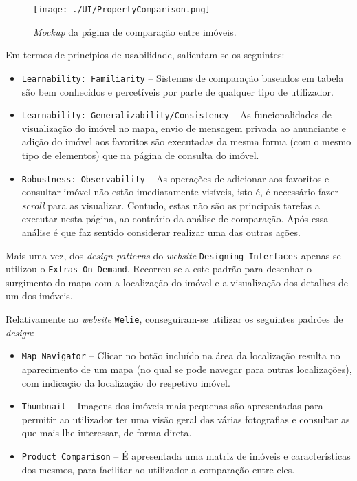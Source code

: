 \begin{figure}[H]
    \centering
    \texttt{[image: ./UI/PropertyComparison.png]}
    \caption{\textit{Mockup} da página de comparação entre imóveis.}
    \label{fig:property_comparison}
\end{figure}

Em termos de princípios de usabilidade, salientam-se os seguintes:

\begin{itemize}
    \item \texttt{Learnability: Familiarity} -- Sistemas de comparação baseados em tabela são bem conhecidos e percetíveis por parte de qualquer tipo de utilizador.
    
    \item \texttt{Learnability: Generalizability/Consistency} -- As funcionalidades de visualização do imóvel no mapa, envio de mensagem privada ao anunciante e adição do imóvel aos favoritos são executadas da mesma forma (com o mesmo tipo de elementos) que na página de consulta do imóvel.
    
    \item \texttt{Robustness: Observability} -- As operações de adicionar aos favoritos e consultar imóvel não estão imediatamente visíveis, isto é, é necessário fazer \textit{scroll} para as visualizar. Contudo, estas não são as principais tarefas a executar nesta página, ao contrário da análise de comparação. Após essa análise é que faz sentido considerar realizar uma das outras ações.
\end{itemize}

Mais uma vez, dos \textit{design patterns} do \textit{website} \texttt{Designing Interfaces} apenas se utilizou o \texttt{Extras On Demand}. Recorreu-se a este padrão para desenhar o surgimento do mapa com a localização do imóvel e a visualização dos detalhes de um dos imóveis.

Relativamente ao \textit{website} \texttt{Welie}, conseguiram-se utilizar os seguintes padrões de \textit{design}:

\begin{itemize}
    \item \texttt{Map Navigator} -- Clicar no botão incluído na área da localização resulta no aparecimento de um mapa (no qual se pode navegar para outras localizações), com indicação da localização do respetivo imóvel.
        
    \item \texttt{Thumbnail} -- Imagens dos imóveis mais pequenas são apresentadas para permitir ao utilizador ter uma visão geral das várias fotografias e consultar as que mais lhe interessar, de forma direta.
    
    \item \texttt{Product Comparison} -- É apresentada uma matriz de imóveis e características dos mesmos, para facilitar ao utilizador a comparação entre eles.
\end{itemize}


